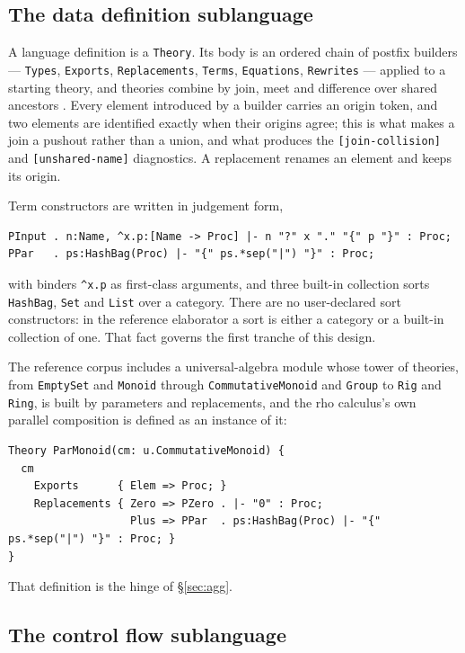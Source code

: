 \documentclass[11pt]{article}
\theoremstyle{definition}
\theoremstyle{plain}
\theoremstyle{remark}
\newcommand{\rhoc}{\textsf{rho}}
\begin{document}
\subsection{The data definition sublanguage}

A language definition is a \texttt{Theory}. Its body is an ordered chain of
postfix builders --- \texttt{Types}, \texttt{Exports}, \texttt{Replacements},
\texttt{Terms}, \texttt{Equations}, \texttt{Rewrites} --- applied to a starting
theory, and theories combine by join, meet and difference over shared ancestors
\cite{modulesyntax}. Every element introduced by a builder carries an origin
token, and two elements are identified exactly when their origins agree; this is
what makes a join a pushout rather than a union, and what produces the
\texttt{[join-collision]} and \texttt{[unshared-name]} diagnostics. A
replacement renames an element and keeps its origin.

Term constructors are written in judgement form,
\begin{lstlisting}[language=mettail]
PInput . n:Name, ^x.p:[Name -> Proc] |- n "?" x "." "{" p "}" : Proc;
PPar   . ps:HashBag(Proc) |- "{" ps.*sep("|") "}" : Proc;
\end{lstlisting}
with binders \verb|^x.p| as first-class arguments, and three built-in
collection sorts \texttt{HashBag}, \texttt{Set} and \texttt{List} over a
category. There are no user-declared sort constructors: in the reference
elaborator a sort is either a category or a built-in collection of one. That
fact governs the first tranche of this design.

The reference corpus includes a universal-algebra module whose tower of
theories, from \texttt{EmptySet} and \texttt{Monoid} through
\texttt{CommutativeMonoid} and \texttt{Group} to \texttt{Rig} and
\texttt{Ring}, is built
by parameters and replacements, and the \rhoc{} calculus's own parallel
composition is defined as an instance of it:
\begin{lstlisting}[language=mettail]
Theory ParMonoid(cm: u.CommutativeMonoid) {
  cm
    Exports      { Elem => Proc; }
    Replacements { Zero => PZero . |- "0" : Proc;
                   Plus => PPar  . ps:HashBag(Proc) |- "{" ps.*sep("|") "}" : Proc; }
}
\end{lstlisting}
That definition is the hinge of \S\ref{sec:agg}.

\subsection{The control flow sublanguage}
\end{document}
